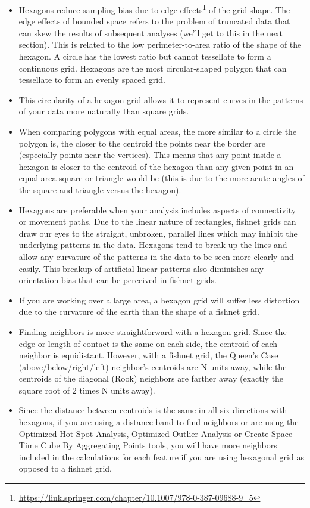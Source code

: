 \documentclass[
  krantz2]{krantz}
\providecommand{\tightlist}{%
  \setlength{\itemsep}{0pt}\setlength{\parskip}{0pt}}
\renewcommand{\href}[2]{#2\footnote{\url{#1}}}
\begin{document}
\begin{itemize}
\tightlist
\item
  Hexagons reduce sampling bias due to \href{https://link.springer.com/chapter/10.1007/978-0-387-09688-9_5}{edge effects} of the grid shape. The edge effects of bounded space refers to the problem of truncated data that can skew the results of subsequent analyses (we'll get to this in the next section). This is related to the low perimeter-to-area ratio of the shape of the hexagon. A circle has the lowest ratio but cannot tessellate to form a continuous grid. Hexagons are the most circular-shaped polygon that can tessellate to form an evenly spaced grid.
\item
  This circularity of a hexagon grid allows it to represent curves in the patterns of your data more naturally than square grids.
\item
  When comparing polygons with equal areas, the more similar to a circle the polygon is, the closer to the centroid the points near the border are (especially points near the vertices). This means that any point inside a hexagon is closer to the centroid of the hexagon than any given point in an equal-area square or triangle would be (this is due to the more acute angles of the square and triangle versus the hexagon).
\item
  Hexagons are preferable when your analysis includes aspects of connectivity or movement paths. Due to the linear nature of rectangles, fishnet grids can draw our eyes to the straight, unbroken, parallel lines which may inhibit the underlying patterns in the data. Hexagons tend to break up the lines and allow any curvature of the patterns in the data to be seen more clearly and easily. This breakup of artificial linear patterns also diminishes any orientation bias that can be perceived in fishnet grids.
\item
  If you are working over a large area, a hexagon grid will suffer less distortion due to the curvature of the earth than the shape of a fishnet grid.
\item
  Finding neighbors is more straightforward with a hexagon grid. Since the edge or length of contact is the same on each side, the centroid of each neighbor is equidistant. However, with a fishnet grid, the Queen's Case (above/below/right/left) neighbor's centroids are N units away, while the centroids of the diagonal (Rook) neighbors are farther away (exactly the square root of 2 times N units away).
\item
  Since the distance between centroids is the same in all six directions with hexagons, if you are using a distance band to find neighbors or are using the Optimized Hot Spot Analysis, Optimized Outlier Analysis or Create Space Time Cube By Aggregating Points tools, you will have more neighbors included in the calculations for each feature if you are using hexagonal grid as opposed to a fishnet grid.
\end{itemize}
\end{document}
